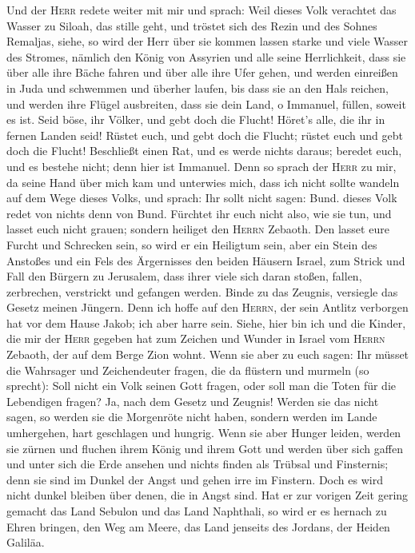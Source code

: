  Und der \textsc{Herr} redete weiter mit mir und sprach:
 Weil dieses Volk verachtet das Wasser zu Siloah, das
stille geht, und tröstet sich des Rezin und des Sohnes Remaljas,
 siehe, so wird der Herr über sie kommen lassen starke und
viele Wasser des Stromes, nämlich den König von Assyrien und alle seine
Herrlichkeit, dass sie über alle ihre Bäche fahren und über alle ihre
Ufer gehen,  und werden einreißen in Juda und schwemmen
und überher laufen, bis dass sie an den Hals reichen, und werden ihre
Flügel ausbreiten, dass sie dein Land, o Immanuel, füllen, soweit es
ist.  Seid böse, ihr Völker, und gebt doch die Flucht!
Höret's alle, die ihr in fernen Landen seid! Rüstet euch, und gebt doch
die Flucht; rüstet euch und gebt doch die Flucht! 
Beschließt einen Rat, und es werde nichts daraus; beredet euch, und es
bestehe nicht; denn hier ist Immanuel.  Denn so sprach
der \textsc{Herr} zu mir, da seine Hand über mich kam und unterwies
mich, dass ich nicht sollte wandeln auf dem Wege dieses Volks, und
sprach:  Ihr sollt nicht sagen: Bund. dieses Volk redet
von nichts denn von Bund. Fürchtet ihr euch nicht also, wie sie tun, und
lasset euch nicht grauen;  sondern heiliget den
\textsc{Herrn} Zebaoth. Den lasset eure Furcht und Schrecken sein,
 so wird er ein Heiligtum sein, aber ein Stein des
Anstoßes und ein Fels des Ärgernisses den beiden Häusern Israel, zum
Strick und Fall den Bürgern zu Jerusalem,  dass ihrer
viele sich daran stoßen, fallen, zerbrechen, verstrickt und gefangen
werden.  Binde zu das Zeugnis, versiegle das Gesetz
meinen Jüngern.  Denn ich hoffe auf den \textsc{Herrn},
der sein Antlitz verborgen hat vor dem Hause Jakob; ich aber harre sein.
 Siehe, hier bin ich und die Kinder, die mir der
\textsc{Herr} gegeben hat zum Zeichen und Wunder in Israel vom
\textsc{Herrn} Zebaoth, der auf dem Berge Zion wohnt. 
Wenn sie aber zu euch sagen: Ihr müsset die Wahrsager und Zeichendeuter
fragen, die da flüstern und murmeln (so sprecht): Soll nicht ein Volk
seinen Gott fragen, oder soll man die Toten für die Lebendigen fragen?
 Ja, nach dem Gesetz und Zeugnis! Werden sie das nicht
sagen, so werden sie die Morgenröte nicht haben,  sondern
werden im Lande umhergehen, hart geschlagen und hungrig. Wenn sie aber
Hunger leiden, werden sie zürnen und fluchen ihrem König und ihrem Gott
 und werden über sich gaffen und unter sich die Erde
ansehen und nichts finden als Trübsal und Finsternis; denn sie sind im
Dunkel der Angst und gehen irre im Finstern.  Doch es
wird nicht dunkel bleiben über denen, die in Angst sind. Hat er zur
vorigen Zeit gering gemacht das Land Sebulon und das Land Naphthali, so
wird er es hernach zu Ehren bringen, den Weg am Meere, das Land jenseits
des Jordans, der Heiden Galiläa.

